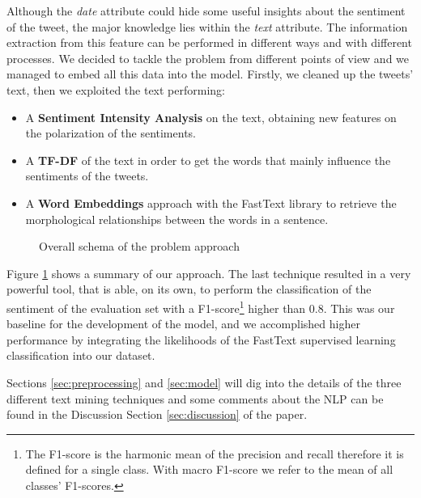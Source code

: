 \documentclass[conference]{IEEEtran}
\begin{document}
Although the \textit{date} attribute could hide some useful insights about the sentiment of the tweet, the major knowledge lies within the \textit{text} attribute. The information extraction from this feature can be performed in different ways and with different processes. We decided to tackle the problem from different points of view and we managed to embed all this data into the model. Firstly, we cleaned up the tweets' text, then we exploited the text performing:
\begin{itemize}
    \item A \textbf{Sentiment Intensity Analysis}\cite{sentiment_analysis} on the text, obtaining new features on the polarization of the sentiments.
    \item A \textbf{TF-DF}%
    of the text in order to get the words that mainly influence the sentiments of the tweets.
    \item A \textbf{Word Embeddings}\cite{wordembeddings} approach with the FastText\cite{fasttext} library to retrieve the morphological relationships between the words in a sentence.
\end{itemize}
\begin{figure}[h]
        \centering
        
        \caption{Overall schema of the problem approach}
        \label{fig:overall_schema}
\end{figure}
Figure \ref{fig:overall_schema} shows a summary of our approach.
The last technique resulted in a very powerful tool, that is able, on its own, to perform the classification of the sentiment of the evaluation set with a F1-score\footnote{The F1-score is the harmonic mean of the precision and recall therefore it is defined for a single class. With macro F1-score we refer to the mean of all classes' F1-scores.}
higher than 0.8. This was our baseline for the development of the model, and we accomplished higher performance by integrating the likelihoods of the FastText supervised learning classification\cite{fasttextclassifier} into our dataset. 

Sections \ref{sec:preprocessing} and \ref{sec:model} will dig into the details of the three different text mining techniques and some comments about the NLP can be found in the Discussion Section \ref{sec:discussion} of the paper.
\end{document}
